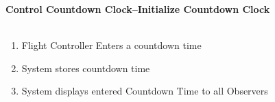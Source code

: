 \documentclass[letterpaper]{article}
\begin{document}
\noindent
\textbf{Control Countdown Clock--Initialize Countdown Clock}\\\\
\begin{enumerate}
\item Flight Controller Enters a countdown time
\item System stores countdown time
\item System displays entered Countdown Time to all Observers
\end{enumerate}
\end{document}
